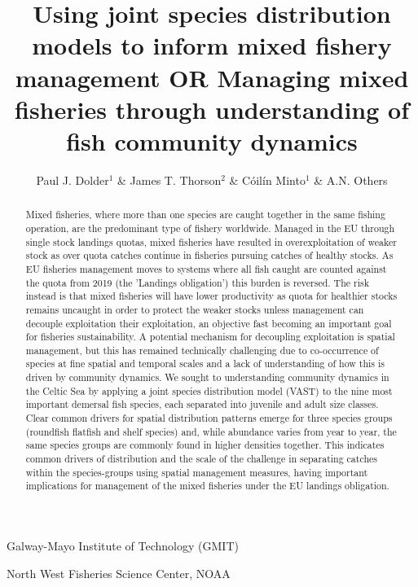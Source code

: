 \documentclass{nature}
\title{Using joint species distribution models to inform mixed fishery
	management OR Managing mixed fisheries through understanding of fish
	community dynamics}
\author{Paul J. Dolder$^1$ \& James T. Thorson$^2$ \& Cóilín Minto$^1$ \& A.N.
Others}
\begin{document}
\maketitle

\begin{affiliations}
\item Galway-Mayo Institute of Technology (GMIT) 
\item North West Fisheries Science Center, NOAA
\end{affiliations}

\begin{linenumbers}

\begin{abstract} 
Mixed fisheries, where more than one species are caught together in the same
fishing operation, are the predominant type of fishery worldwide. Managed in
the EU through single stock landings quotas, mixed fisheries have resulted in
overexploitation of weaker stock as over quota catches continue in fisheries
pursuing catches of healthy stocks. As EU fisheries management moves to systems
where all fish caught are counted against the quota from 2019 (the 'Landings
obligation') this burden is reversed. The risk instead is that mixed fisheries
will have lower productivity as quota for healthier stocks remains uncaught in
order to protect the weaker stocks unless management can decouple exploitation
their exploitation, an objective fast becoming an important goal for fisheries
sustainability.  A potential mechanism for decoupling exploitation is spatial
management, but this has remained technically challenging due to co-occurrence
of species at fine spatial and temporal scales and a lack of understanding of
how this is driven by community dynamics.  We sought to understanding community
dynamics in the Celtic Sea by applying a joint species distribution model
(VAST) to the nine most important demersal fish species, each separated into
juvenile and adult size classes.  \\

Clear common drivers for spatial distribution patterns emerge for three species
groups (roundfish flatfish and shelf species) and, while abundance varies from
year to year, the same species groups are commonly found in higher densities
together. This indicates common drivers of distribution and the scale of the
challenge in separating catches within the species-groups using spatial
management measures, having important implications for management of the mixed
fisheries under the EU landings obligation.


\end{abstract}
\end{linenumbers}
\end{document}
